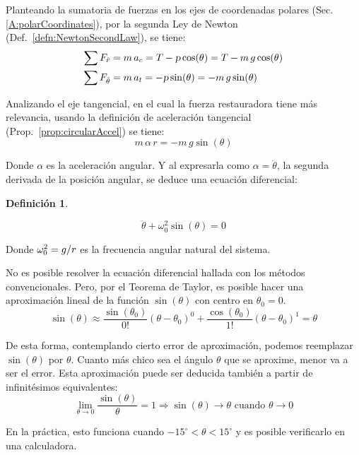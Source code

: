 \documentclass[a5paper,12pt,twoside]{book}
\newtheorem{defn}{{Definición}}[chapter]
\begin{document}
Planteando la sumatoria de fuerzas en los ejes de coordenadas polares (Sec. \ref{A:polarCoordinates}), por la segunda Ley de Newton (Def.\ \ref{defn:NewtonSecondLaw}), se tiene:
\begin{align*}
    \sum F_{\hat{r}} &= m \, a_c = T - \textsl{p} \cos(\theta) = T - m \, g \cos(\theta)
    \\
    \sum F_{\hat{\theta}} &= m \, a_t = - \textsl{p} \sin(\theta) = - m \, g \sin(\theta)
\end{align*}

Analizando el eje tangencial, en el cual la fuerza restauradora tiene más relevancia, usando la definición de aceleración tangencial (Prop.\ \ref{prop:circularAccel}) se tiene:
\[ m \, \alpha \, r = - m \, g \sin(\theta) \]

Donde $\alpha$ es la aceleración angular. Y al expresarla como $\alpha = \ddot{\theta}$, la segunda derivada de la posición angular, se deduce una ecuación diferencial:

\begin{mdframed}[style=MyFrame1]
    \begin{defn}
    \end{defn}
    \begin{equation*}
        \ddot{\theta} + \omega_0^2 \sin(\theta) = 0
    \end{equation*}
\end{mdframed}

Donde $\omega_0^2=g/r$ es la frecuencia angular natural del sistema.

No es posible resolver la ecuación diferencial hallada con los métodos convencionales. Pero, por el Teorema de Taylor, es posible hacer una aproximación lineal de la función $\sin{(\theta)}$ con centro en $\theta_0 = 0$.
\[
  \sin(\theta) \approx \frac{\sin(\theta_0)}{0!} \left( \theta-\theta_0 \right)^0 + \frac{\cos(\theta_0)}{1!} \left( \theta-\theta_0 \right)^1 = \theta
\]

De esta forma, contemplando cierto error de aproximación, podemos reemplazar $\sin{(\theta)}$ por $\theta$. Cuanto más chico sea el ángulo $\theta$ que se aproxime, menor va a ser el error. Esta aproximación puede ser deducida también a partir de infinitésimos equivalentes:
\[
  \lim_{\theta \to 0} \frac{\sin(\theta)}{\theta} = 1 \Rightarrow \sin(\theta) \to \theta \text{ cuando } \theta \to 0
\]

En la práctica, esto funciona cuando $-15^{\circ}<\theta<15^{\circ}$ y es posible verificarlo en una calculadora.
\end{document}
